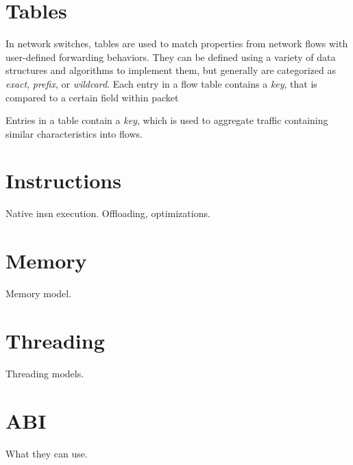 \section{Tables}
\label{vm:tables}
In network switches, tables are used to match properties from network flows
with user-defined forwarding behaviors. They can be defined using a variety of
data structures and algorithms to implement them, but generally are categorized
as \emph{exact}, \emph{prefix}, or \emph{wildcard}. Each entry in a flow table
contains a \emph{key}, that is compared to a certain field within packet

Entries in a table contain a \emph{key}, which is used to aggregate traffic
containing similar characteristics into flows.



\section{Instructions}
\label{vm:insn}
Native insn execution. Offloading, optimizations.

\section{Memory}
\label{vm:memory}
Memory model.

\section{Threading}
\label{vm:threading}
Threading models.

\section{ABI}
\label{hosting:abi}
What they can use.
